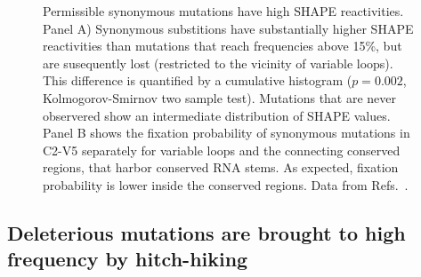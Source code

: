 \documentclass[rmp, twocolumn]{revtex4}
\begin{document}
\begin{figure}
\begin{center}
\caption{Permissible synonymous mutations have
high SHAPE reactivities.
Panel A) Synonymous substitions have
substantially higher SHAPE reactivities than mutations that reach frequencies above 15\%, but are
susequently lost (restricted to the vicinity of variable loops). This difference
is quantified by a cumulative histogram ($p=0.002$, Kolmogorov-Smirnov two 
sample test). Mutations that are never
observered show an intermediate distribution of SHAPE values.
Panel B shows the fixation probability of synonymous mutations in C2-V5
separately for variable loops and the connecting conserved regions, that
harbor conserved RNA stems. As expected, fixation probability is lower inside
the conserved regions. Data from Refs.~\cite{shankarappa_consistent_1999,
bunnik_autologous_2008, liu_selection_2006}.}
\label{fig:SHAPE}
\end{center}
\end{figure}


\subsection{Deleterious mutations are brought to high frequency by hitch-hiking}
\end{document}
